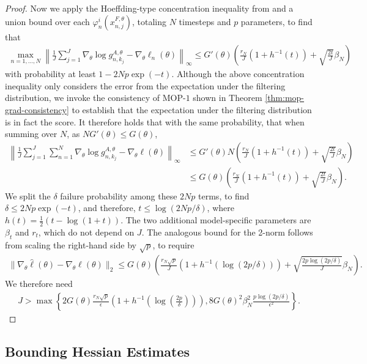 \begin{proof}
Now we apply the Hoeffding-type concentration inequality from \cite{delMoral11} and a union bound over each $\varphi_n^i(x_{n,j}^{F,\theta})$, totaling $N$ timesteps and $p$ parameters, to find that
\begin{align}
    \max_{n=1,...,N} \left\lVert\frac{1}{J}\sum_{j=1}^J\nabla_\theta \log g_{n,k_j}^{A,\theta} - \nabla_\theta \ell_n(\theta) \right\rVert_{\infty} \leq G'(\theta)\left(\frac{r_N}{J}(1+h^{-1}(t)) + \sqrt{\frac{2t}{J}}\beta_N \right)
\end{align}
with probability at least $1-2Np\exp(-t)$. Although the above concentration inequality only considers the error from the expectation under the filtering distribution, we invoke the consistency of MOP-$1$ shown in Theorem \ref{thm:mop-grad-consistency} to establish that the expectation under the filtering distribution is in fact the score. It therefore holds that with the same probability, that when summing over $N$, as $NG'(\theta) \leq G(\theta)$, 
\begin{align}
    \left\lVert\frac{1}{J}\sum_{j=1}^J\sum_{n=1}^N\nabla_\theta \log g_{n,k_j}^{A,\theta} - \nabla_\theta \ell(\theta) \right\rVert_{\infty} 
    &\leq G'(\theta)N\left(\frac{r_N}{J}(1+h^{-1}(t)) + \sqrt{\frac{2t}{J}}\beta_N \right)\\
    &\leq G(\theta)\left(\frac{r_N}{J}(1+h^{-1}(t)) + \sqrt{\frac{2t}{J}}\beta_N \right).
\end{align}
We split the $\delta$ failure probability among these $2Np$ terms, to find $\delta\leq2Np\exp(-t)$, and therefore, $t\leq\log(2Np/\delta)$, where $h(t) = \frac{1}{2}(t - \log(1+t))$. 
The two additional model-specific parameters are $\beta_t$ and $r_t$, which do not depend on $J$. 
The analogous bound for the 2-norm follows from scaling the right-hand side by $\sqrt{p}$, to require 
\begin{align}
    \|\nabla_\theta \hat\ell(\theta) - \nabla_\theta \ell(\theta)\|_2 \leq G(\theta)\left(\frac{r_N\sqrt{p}}{J}(1+h^{-1}(\log(2p/\delta))) + \sqrt{\frac{2p\log(2p/\delta)}{J}}\beta_N\right).
\end{align}
We therefore need 
\begin{align}
    J > \max\left\{2G(\theta)\frac{r_N\sqrt{p}}{\epsilon}\left(1+h^{-1}\left(\log\left(\frac{2p}{\delta}\right)\right)\right), 8G(\theta)^2\beta_N^2\frac{p\log(2p/\delta)}{\epsilon^2}\right\}.
\end{align}

\end{proof}


\subsection{Bounding Hessian Estimates}

